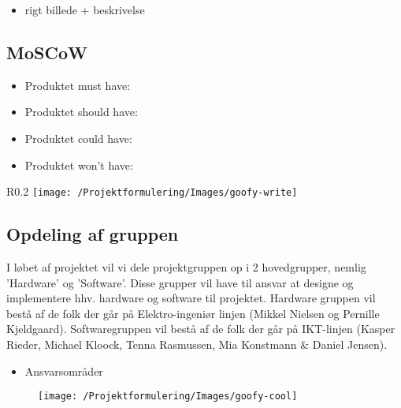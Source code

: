 \begin{itemize}
	\item{rigt billede + beskrivelse}
\end{itemize}


\subsection{MoSCoW}
\begin{itemize}
	\item{Produktet must have:}
	\item{Produktet should have:}
	\item{Produktet could have:}
	\item{Produktet won't have:}
\end{itemize}

\begin{wrapfigure}{R}{0.2\textwidth}
	\texttt{[image: /Projektformulering/Images/goofy-write]}
\end{wrapfigure}
\subsection{Opdeling af gruppen}
I løbet af projektet vil vi dele projektgruppen op i 2 hovedgrupper, nemlig 'Hardware' og 'Software'. Disse grupper vil have til ansvar at designe og implementere hhv. hardware og software til projektet. Hardware gruppen vil bestå af de folk der går på Elektro-ingeniør linjen (Mikkel Nielsen og Pernille Kjeldgaard). Softwaregruppen vil bestå af de folk der går på IKT-linjen (Kasper Rieder, Michael Kloock, Tenna Rasmussen, Mia Konstmann \& Daniel Jensen).
\begin{itemize}
	\item{Ansvarsområder}
\end{itemize}

\begin{figure}[H]
	\texttt{[image: /Projektformulering/Images/goofy-cool]}
\end{figure}
